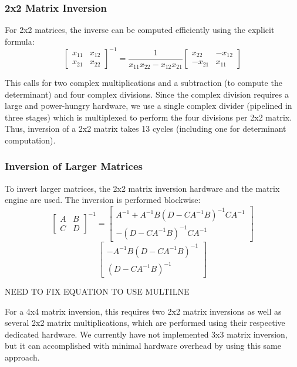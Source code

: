 \documentclass[journal]{IEEEtran}
\begin{document}
\subsubsection{2x2 Matrix Inversion}

For 2x2 matrices, the inverse can be computed efficiently using the explicit formula:
\[\left[ \begin{array}{cc} x_{11} & x_{12} \\ x_{21} & x_{22} \end{array}\right]^{-1} = \frac{1}{x_{11}x_{22}-x_{12}x_{21}}\left[ \begin{array}{cc} x_{22} & -x_{12} \\ -x_{21} & x_{11} \end{array}\right]\]

This calls for two complex multiplications and a subtraction (to compute the determinant) and four complex divisions. Since the complex division requires a large and power-hungry hardware, we use a single complex divider (pipelined in three stages) which is multiplexed to perform the four divisions per 2x2 matrix. Thus, inversion of a 2x2 matrix takes 13 cycles (including one for determinant computation).

\subsubsection{Inversion of Larger Matrices}

To invert larger matrices, the 2x2 matrix inversion hardware and the matrix engine are used. The inversion is performed blockwise:
\[\left[ \begin{array}{cc} A & B \\ C & D \end{array}\right]^{-1} = \left[ \begin{array}{c} A^{-1}+A^{-1}B(D-CA^{-1}B)^{-1}CA^{-1} \\ -(D-CA^{-1}B)^{-1}CA^{-1} \end{array} \right] \]
\[ \left[ \begin{array}{c} -A^{-1}B(D-CA^{-1}B)^{-1} \\  (D-CA^{-1}B)^{-1} \end{array}\right]\]

NEED TO FIX EQUATION TO USE MULTILNE

For a 4x4 matrix inversion, this requires two 2x2 matrix inversions as well as several 2x2 matrix multiplications, which are performed using their respective dedicated hardware. We currently have not implemented 3x3 matrix inversion, but it can accomplished with minimal hardware overhead by using this same approach. 
\end{document}
